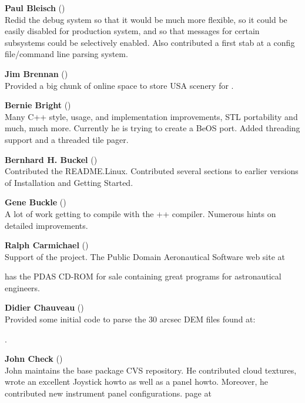 \noindent \textbf{Paul Bleisch} ()\\
  Redid the debug system so that it would be much more
  flexible, so it could be easily disabled for production system, and
  so that messages for certain subsystems could be selectively
  enabled. Also contributed a first stab at a config file/command line parsing
  system.
 \medskip


\noindent \textbf{Jim Brennan} ()\\
  Provided a big chunk of online space to store USA scenery for \FlightGear{}$\!$.
 \medskip

\noindent \textbf{Bernie Bright}
()\\
  Many C++ style, usage, and implementation improvements, STL
  portability and much, much more. Currently he is trying to create a BeOS port. Added threading support and a threaded tile pager.
 \medskip

\noindent \textbf{Bernhard H. Buckel}
()\\
  Contributed the README.Linux.  Contributed several sections to earlier versions of
 Installation and Getting Started.
 \medskip

\noindent \textbf{Gene Buckle} ()\\
  A lot of work getting \FlightGear{} to compile with the ++
  compiler. Numerous hints on detailed improvements.
 \medskip


\noindent \textbf{Ralph Carmichael} ()\\
  Support of the project. The Public Domain Aeronautical Software web site at
\medskip

 \medskip

 \noindent
 has the PDAS CD-ROM for sale containing great programs for astronautical engineers.

\noindent \textbf{Didier Chauveau}
()\\
  Provided some initial code to parse the 30 arcsec DEM files found at:
   \medskip

  .
 \medskip

\noindent \textbf{John Check} ()\\
 John maintains the base package CVS repository. He contributed cloud textures, wrote an excellent Joystick howto as well as a panel
 howto. Moreover, he contributed new instrument panel configurations. \FlightGear{}
 page at
 \medskip

